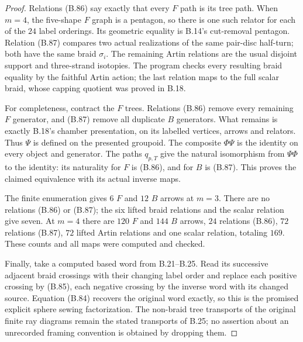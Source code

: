 \begin{proof}
Relations (B.86) say exactly that every $F$ path is
its tree path.  When $m=4$, the five-shape $F$ graph
is a pentagon, so there is one such relator for each
of the $24$ label orderings.  Its geometric equality
is B.14's cut-removal pentagon.  Relation (B.87)
compares two actual realizations of the same pair-disc
half-turn; both have the same braid $\sigma_i$.
The remaining Artin relations are the usual disjoint
support and three-strand isotopies.  The program checks
every resulting braid equality by the faithful Artin
action; the last relation maps to the full scalar braid,
whose capping quotient was proved in B.18.

For completeness, contract the $F$ trees.  Relations
(B.86) remove every remaining $F$ generator, and
(B.87) remove all duplicate $B$ generators.  What
remains is exactly B.18's chamber presentation, on
its labelled vertices, arrows and relators.  Thus
$\Psi$ is defined on the presented groupoid.
The composite $\Phi\Psi$ is the identity on every
object and generator.  The paths $q_{p,T}$ give
the natural isomorphism from $\Psi\Phi$ to the
identity: its naturality for $F$ is (B.86), and
for $B$ is (B.87).  This proves the claimed
equivalence with its actual inverse maps.

The finite enumeration gives $6$ $F$ and $12$ $B$
arrows at $m=3$.  There are no relations (B.86) or
(B.87); the six lifted braid relations and the
scalar relation give seven.  At $m=4$ there are
$120$ $F$ and $144$ $B$ arrows, $24$ relations
(B.86), $72$ relations (B.87), $72$ lifted Artin
relations and one scalar relation, totaling $169$.
These counts and all maps were computed and checked.

Finally, take a computed based word from B.21--B.25.
Read its successive adjacent braid crossings with
their changing label order and replace each positive
crossing by (B.85), each negative crossing by the
inverse word with its changed source.  Equation
(B.84) recovers the original word exactly, so this
is the promised explicit sphere sewing factorization.
The non-braid tree transports of the original finite
ray diagrams remain the stated transports of B.25;
no assertion about an unrecorded framing convention
is obtained by dropping them.
\end{proof}
